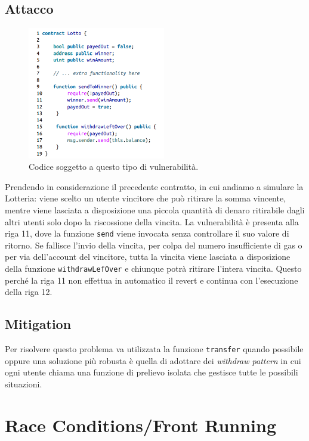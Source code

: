 \subsection{Attacco}

\begin{figure}[H]
      \centering
      \includegraphics[width=6cm, keepaspectratio]{capitoli/ethereum/imgs/unchecked_call.png}
      \caption{Codice soggetto a questo tipo di vulnerabilità.}
\end{figure}

Prendendo in considerazione il precedente contratto, in cui andiamo a simulare
la Lotteria: viene scelto un utente vincitore che può ritirare la somma vincente,
mentre viene lasciata a disposizione una piccola quantità di denaro ritirabile
dagli altri utenti solo dopo la riscossione della vincita.
La vulnerabilità è presenta alla riga 11, dove la funzione \verb|send| viene
invocata senza controllare il suo valore di ritorno. Se fallisce l'invio della
vincita, per colpa del numero insufficiente di gas o per via dell'account del
vincitore, tutta la vincita viene lasciata a disposizione della funzione
\verb|withdrawLefOver| e chiunque potrà ritirare l'intera vincita.
Questo perché la riga 11 non effettua in automatico il revert e continua
con l'esecuzione della riga 12.

\subsection{Mitigation}

Per risolvere questo problema va utilizzata la funzione \verb|transfer|
quando possibile oppure una soluzione più robusta è quella di adottare dei
\textit{withdraw pattern} in cui ogni utente chiama una funzione di prelievo
isolata che gestisce tutte le possibili situazioni.

\section{Race Conditions/Front Running}

